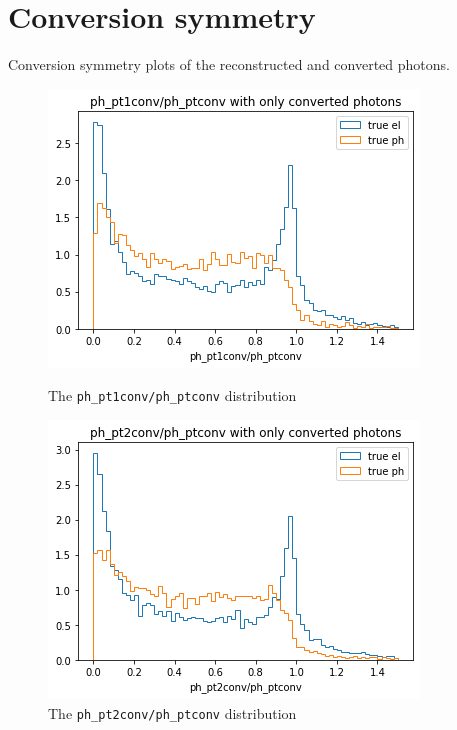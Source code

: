 \documentclass[a4paper, oneside, 11pt, openright]{book}
\begin{document}
	\appendix
	\chapter{Conversion symmetry} \label{Appex: sym}
		Conversion symmetry plots of the reconstructed and converted photons. %
		\begin{figure}[H]  
			\begin{minipage}[b]{0.5\linewidth}
				\centering
				\includegraphics[width=.9\linewidth]{tesi_images/pt1_pt.png} 
				\caption{The \texttt{ph\_pt1conv/ph\_ptconv} distribution} 
				\label{fig: pt1/pt}
				\vspace{4ex}
			\end{minipage}%
			\begin{minipage}[b]{0.5\linewidth}
				\centering
				\includegraphics[width=.9\linewidth]{tesi_images/pt2_pt.png} 
				\caption{The \texttt{ph\_pt2conv/ph\_ptconv} distribution}
				\label{fig: pt2/pt} 
				\vspace{4ex}
			\end{minipage}
		\end{figure} 
\end{document}
